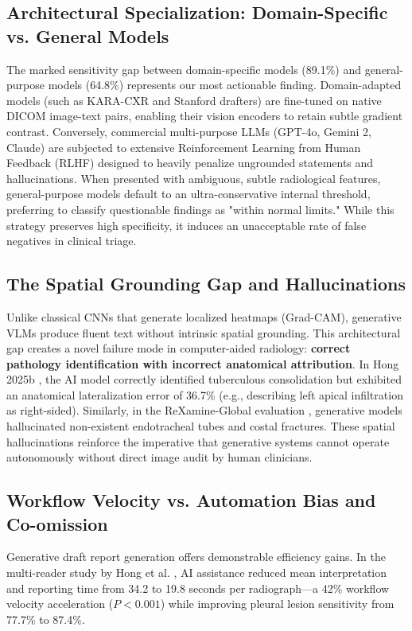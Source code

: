 \documentclass[preprint,11pt]{elsarticle}
\begin{document}
\subsection{Architectural Specialization: Domain-Specific vs. General Models}
The marked sensitivity gap between domain-specific models (89.1\%) and general-purpose models (64.8\%) represents our most actionable finding. Domain-adapted models (such as KARA-CXR and Stanford drafters) are fine-tuned on native DICOM image-text pairs, enabling their vision encoders to retain subtle gradient contrast. Conversely, commercial multi-purpose LLMs (GPT-4o, Gemini 2, Claude) are subjected to extensive Reinforcement Learning from Human Feedback (RLHF) designed to heavily penalize ungrounded statements and hallucinations. When presented with ambiguous, subtle radiological features, general-purpose models default to an ultra-conservative internal threshold, preferring to classify questionable findings as "within normal limits." While this strategy preserves high specificity, it induces an unacceptable rate of false negatives in clinical triage.

\subsection{The Spatial Grounding Gap and Hallucinations}
Unlike classical CNNs that generate localized heatmaps (Grad-CAM), generative VLMs produce fluent text without intrinsic spatial grounding. This architectural gap creates a novel failure mode in computer-aided radiology: \textbf{correct pathology identification with incorrect anatomical attribution}. In Hong 2025b \cite{hong2025b}, the AI model correctly identified tuberculous consolidation but exhibited an anatomical lateralization error of 36.7\% (e.g., describing left apical infiltration as right-sided). Similarly, in the ReXamine-Global evaluation \cite{banerjee}, generative models hallucinated non-existent endotracheal tubes and costal fractures. These spatial hallucinations reinforce the imperative that generative systems cannot operate autonomously without direct image audit by human clinicians.

\subsection{Workflow Velocity vs. Automation Bias and Co-omission}
Generative draft report generation offers demonstrable efficiency gains. In the multi-reader study by Hong et al. \cite{hong2025c}, AI assistance reduced mean interpretation and reporting time from 34.2 to 19.8 seconds per radiograph—a 42\% workflow velocity acceleration ($P < 0.001$) while improving pleural lesion sensitivity from 77.7\% to 87.4\%. 
\end{document}
